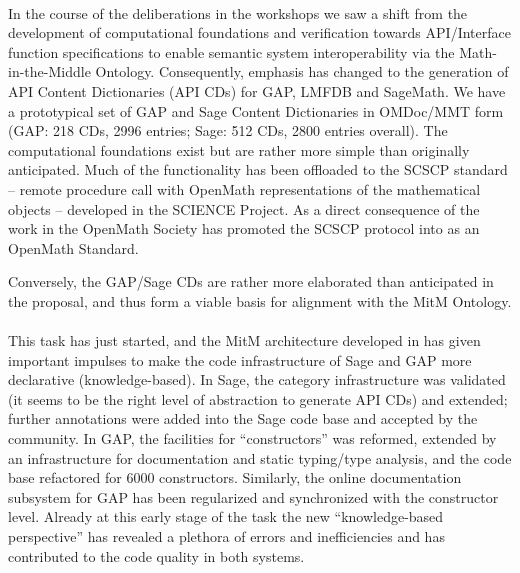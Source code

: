 \documentclass{deliverablereport}
\begin{document}
  \paragraph{}
  In the course of the deliberations in the  workshops we saw a shift from
  the development of computational foundations and verification towards API/Interface
  function specifications to enable semantic system interoperability via the
  Math-in-the-Middle Ontology. Consequently, emphasis has changed to the generation of API
  Content Dictionaries (API CDs) for GAP, LMFDB and SageMath. We have a prototypical set
  of GAP and Sage Content Dictionaries in OMDoc/MMT form (GAP: 218 CDs, 2996 entries;
  Sage: 512 CDs, 2800 entries overall). The computational foundations exist but are rather
  more simple than originally anticipated. Much of the functionality has been offloaded to
  the SCSCP standard -- remote procedure call with OpenMath representations of the
  mathematical objects -- developed in the SCIENCE Project. As a direct consequence of the
  work in \pn the OpenMath Society has promoted the SCSCP protocol into as an OpenMath
  Standard.
  
  Conversely, the GAP/Sage CDs are rather more elaborated than anticipated in the
  proposal, and thus form a viable basis for alignment with the MitM Ontology.

  \paragraph{}
  This task has just started, and the MitM architecture developed in  has
  given important impulses to make the code infrastructure of Sage and GAP more
  declarative (knowledge-based). In Sage, the category infrastructure was validated (it
  seems to be the right level of abstraction to generate API CDs) and extended; further
  annotations were added into the Sage code base and accepted by the community. In GAP,
  the facilities for ``constructors'' was reformed, extended by an infrastructure for
  documentation and static typing/type analysis, and the code base refactored for 6000
  constructors. Similarly, the online documentation subsystem for GAP has been regularized
  and synchronized with the constructor level. Already at this early stage of the task the
  new ``knowledge-based perspective'' has revealed a plethora of errors and inefficiencies
  and has contributed to the code quality in both systems. 
\end{document}
